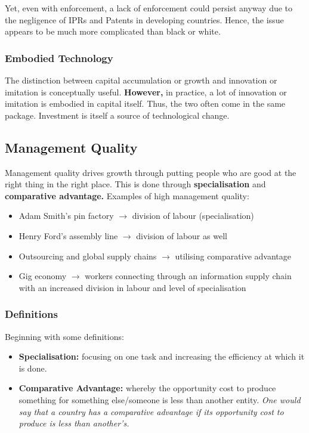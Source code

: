 \documentclass[12pt, letterpaper]{article}
\begin{document}
Yet, even with enforcement, a lack of enforcement could persist anyway due to the negligence of IPRs and Patents in developing countries. Hence, the issue appears to be much more complicated than black or white.

\subsubsection{Embodied Technology}
The distinction between capital accumulation or growth and innovation or imitation is conceptually useful. \textbf{However,} in practice, a lot of innovation or imitation is embodied in capital itself. Thus, the two often come in the same package. Investment is itself a source of technological change.

\subsection{Management Quality}
Management quality drives growth through putting people who are good at the right thing in the right place. This is done through \textbf{specialisation} and \textbf{comparative advantage.} Examples of high management quality:
\begin{itemize}
	\item Adam Smith's pin factory $\rightarrow$ division of labour (specialisation)
	\item Henry Ford's assembly line $\rightarrow$ division of labour as well
	\item Outsourcing and global supply chains $\rightarrow$ utilising comparative advantage
	\item Gig economy $\rightarrow$ workers connecting through an information supply chain with an increased division in labour and level of specialisation
\end{itemize}

\subsubsection{Definitions}
Beginning with some definitions:
\begin{itemize}
	\item \textbf{Specialisation:} focusing on one task and increasing the efficiency at which it is done.
	\item \textbf{Comparative Advantage:} whereby the opportunity cost to produce something for something else/someone is less than another entity. \textit{One would say that a country has a comparative advantage if its opportunity cost to produce is less than another's.}
\end{itemize}
\end{document}
